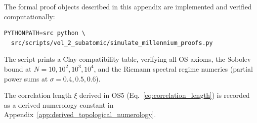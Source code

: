 The formal proof objects described in this appendix are implemented and
verified computationally:

\begin{verbatim}
PYTHONPATH=src python \
  src/scripts/vol_2_subatomic/simulate_millennium_proofs.py
\end{verbatim}

The script prints a Clay-compatibility table, verifying all OS axioms, the
Sobolev bound at $N = 10, 10^2, 10^3, 10^4$, and the Riemann spectral
regime numerics (partial power sums at $\sigma = 0.4, 0.5, 0.6$).

The correlation length $\xi$ derived in OS5
(Eq.~\eqref{eq:correlation_length}) is recorded as a derived numerology
constant in Appendix~\ref{app:derived_topological_numerology}.
